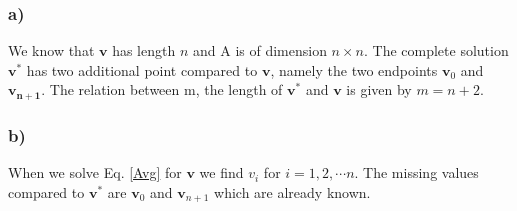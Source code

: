 \subsubsection{a)}

We know that $\mathbf{v}$ has length $n$ and A is of dimension $n\times n$. The complete solution $\mathbf{v}^*$ has two additional point compared to $\mathbf{v}$, namely the two endpoints $\mathbf{v}_0$ and $ \mathbf{v_{n+1}} $. The relation between m, the length of $\mathbf{v}^*$ and $\mathbf{v}$ is given by $m = n+2$. 

\subsubsection{b)}

When we solve Eq. \ref{Avg} for $\mathbf{v}$ we find $v_i$ for $i = 1,2, \cdots n$. The missing values compared to $\mathbf{v}^*$ are $\mathbf{v}_0$ and $\mathbf{v}_{n+1}$ which are already known. 